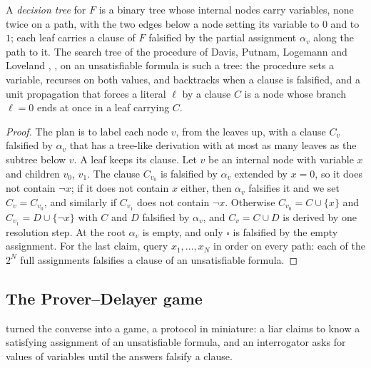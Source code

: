 \begin{refsection}
A \emph{decision tree} for $F$ is a binary tree whose internal nodes carry variables, none twice on a path, with the two edges below a node setting its variable to $0$ and to $1$; each leaf carries a clause of $F$ falsified by the partial assignment $\alpha_v$ along the path to it. The search tree of the procedure of Davis, Putnam, Logemann and Loveland \parencite{DavisPutnam1960,DavisLogemannLoveland1962}, , on an unsatisfiable formula is such a tree: the procedure sets a variable, recurses on both values, and backtracks when a clause is falsified, and a unit propagation that forces a literal $\ell$ by a clause $C$ is a node whose branch $\ell=0$ ends at once in a leaf carrying $C$.


\begin{proof}
The plan is to label each node $v$, from the leaves up, with a clause $C_v$ falsified by $\alpha_v$ that has a tree-like derivation with at most as many leaves as the subtree below $v$. A leaf keeps its clause. Let $v$ be an internal node with variable $x$ and children $v_0$, $v_1$. The clause $C_{v_0}$ is falsified by $\alpha_v$ extended by $x=0$, so it does not contain $\neg x$; if it does not contain $x$ either, then $\alpha_v$ falsifies it and we set $C_v=C_{v_0}$, and similarly if $C_{v_1}$ does not contain $\neg x$. Otherwise $C_{v_0}=C\cup\{x\}$ and $C_{v_1}=D\cup\{\neg x\}$ with $C$ and $D$ falsified by $\alpha_v$, and $C_v=C\cup D$ is derived by one resolution step. At the root $\alpha_v$ is empty, and only $\square$ is falsified by the empty assignment. For the last claim, query $x_1,\dots,x_N$ in order on every path: each of the $2^N$ full assignments falsifies a clause of an unsatisfiable formula.
\end{proof}

\subsection{The Prover--Delayer game}

\Textcite{PudlakImpagliazzo2000} turned the converse into a game, a protocol in miniature: a liar claims to know a satisfying assignment of an unsatisfiable formula, and an interrogator asks for values of variables until the answers falsify a clause.


\end{refsection}
